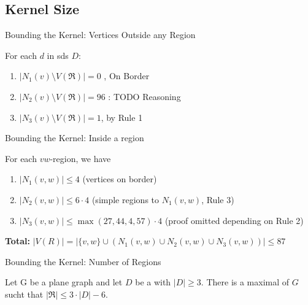 \subsection{Kernel Size}
\begin{frame}[c]{Bounding the Kernel: Vertices Outside any Region}   
    \begin{figure}[!ht]
    \end{figure}

    \pause For each $d$ in sds $D$:
    \begin{enumerate}
           \pause \item $|N_1(v) \setminus V(\mathfrak{R})| = 0$ \cite{Alber2004}, On Border
           \pause \item $|N_2(v) \setminus V(\mathfrak{R})| = 96$ \cite{Alber2004}: TODO Reasoning  
           \pause \item $|N_3(v) \setminus V(\mathfrak{R})| = 1$, by Rule 1
        \end{enumerate}
\end{frame}
\begin{frame}[c]{Bounding the Kernel: Inside a region}

    \begin{figure}[!ht]
    \end{figure}
    For each $vw$-region, we have
    \begin{enumerate}
\pause        \item $|N_1(v,w)| \leq 4$ \cite{Alber2004} (vertices on border)
\pause        \item $|N_2(v,w)| \leq 6 \cdot 4$ (simple regions to $N_1(v,w)$, Rule 3)
\pause        \item $|N_3(v,w)| \leq \max(27,44,4,57) \cdot 4$ (proof omitted depending on Rule 2)
    \end{enumerate}

    \textbf{Total: } $|V(R)| = |\{v, w\} \cup (N_1(v,w) \cup N_2(v, w) \cup N_3(v, w))| \leq 87$
\end{frame}
\begin{frame}[c]{Bounding the Kernel: Number of Regions}

    \begin{figure}[!ht]

    \end{figure}
    \pause\begin{tcolorbox}[colback=TUMBlueLighter,title=Number of Regions \cite{Alber2004}]
        Let G be a plane graph and let $D$ be a \sdom with $|D| \geq 3$. There is a maximal \dreg of $G$ sucht that $|\mathfrak{R}| \leq 3 \cdot |D|- 6$.
    \end{tcolorbox}

\end{frame}

